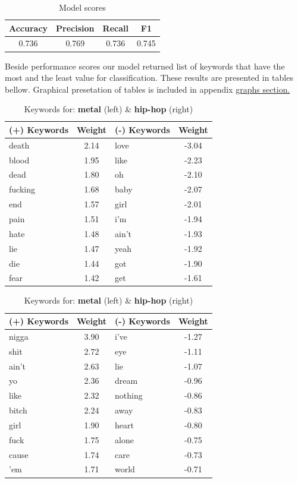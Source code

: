 \documentclass[a4paper,11pt]{article}
\begin{document}
\begin{table}[h!]
\centering
\label{baseline}
\begin{tabular}{|c|c|c|c|}
\hline
Accuracy & Precision & Recall & F1 \\
\hline
0.736 & 0.769 & 0.736 & 0.745 \\
\hline
\end{tabular}
\label{label-model-score}
\caption{Model scores}
\end{table}

\noindent Beside performance scores our model returned list of keywords that have the most and the least value for classification. These results are presented in tables bellow. Graphical presetation of tables is included in appendix \hyperref[label-graphs]{graphs section.}

\begin{table}[h!]
\begin{tabular}{|lc|lc|}
\hline
(+) Keywords & Weight & (-) Keywords & Weight \\
\hline
death & 2.14 & love & -3.04 \\
blood & 1.95 & like & -2.23 \\
dead & 1.80 & oh & -2.10 \\
fucking & 1.68 & baby & -2.07 \\
end & 1.57 & girl & -2.01 \\
pain & 1.51 & i'm & -1.94 \\
hate & 1.48 & ain't & -1.93 \\
lie & 1.47 & yeah & -1.92 \\
die & 1.44 & got & -1.90 \\
fear & 1.42 & get & -1.61 \\
\hline
\end{tabular}
\quad
\begin{tabular}{|lc|lc|}
\hline
(+) Keywords & Weight & (-) Keywords & Weight \\
\hline
nigga & 3.90 & i've & -1.27 \\
shit & 2.72 & eye & -1.11 \\
ain't & 2.63 & lie & -1.07 \\
yo & 2.36 & dream & -0.96 \\
like & 2.32 & nothing & -0.86 \\
bitch & 2.24 & away & -0.83 \\
girl & 1.90 & heart & -0.80 \\
fuck & 1.75 & alone & -0.75 \\
cause & 1.74 & care & -0.73 \\
'em & 1.71 & world & -0.71 \\
\hline
\end{tabular}
\caption{Keywords for: \textbf{metal} (left) \& \textbf{hip-hop} (right)}
\end{table}
\end{document}
